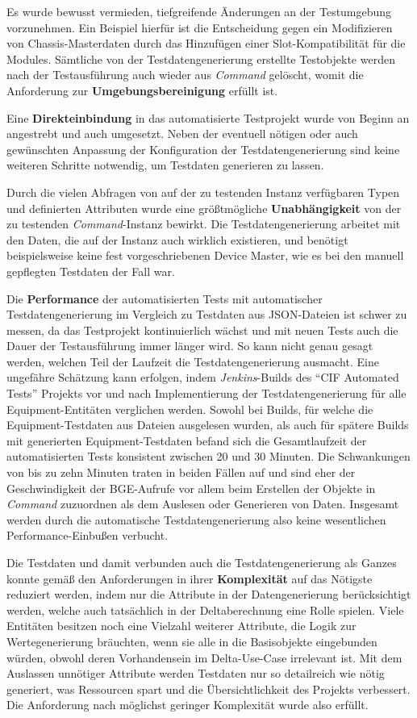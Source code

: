 Es wurde bewusst vermieden, tiefgreifende Änderungen an der Testumgebung vorzunehmen. Ein Beispiel hierfür ist die Entscheidung gegen ein Modifizieren von Chassis-Masterdaten durch das Hinzufügen einer Slot-Kompatibilität für die Modules. Sämtliche von der Testdatengenerierung erstellte Testobjekte werden nach der Testausführung auch wieder aus \textit{Command} gelöscht, womit die Anforderung zur \textbf{Umgebungsbereinigung} erfüllt ist.

Eine \textbf{Direkteinbindung} in das automatisierte Testprojekt wurde von Beginn an angestrebt und auch umgesetzt. Neben der eventuell nötigen oder auch gewünschten Anpassung der Konfiguration der Testdatengenerierung sind keine weiteren Schritte notwendig, um Testdaten generieren zu lassen.

Durch die vielen Abfragen von auf der zu testenden Instanz verfügbaren Typen und definierten Attributen wurde eine größtmögliche \textbf{Unabhängigkeit} von der zu testenden \textit{Command}-Instanz bewirkt. Die Testdatengenerierung arbeitet mit den Daten, die auf der Instanz auch wirklich existieren, und benötigt beispielsweise keine fest vorgeschriebenen Device Master, wie es bei den manuell gepflegten Testdaten der Fall war.

Die \textbf{Performance} der automatisierten Tests mit automatischer Testdatengenerierung im Vergleich zu Testdaten aus \ac{JSON}-Dateien ist schwer zu messen, da das Testprojekt kontinuierlich wächst und mit neuen Tests auch die Dauer der Testausführung immer länger wird. So kann nicht genau gesagt werden, welchen Teil der Laufzeit die Testdatengenerierung ausmacht. Eine ungefähre Schätzung kann erfolgen, indem \textit{Jenkins}-Builds des \enquote{\ac{CIF} Automated Tests} Projekts vor und nach Implementierung der Testdatengenerierung für alle Equipment-Entitäten verglichen werden. Sowohl bei Builds, für welche die Equipment-Testdaten aus Dateien ausgelesen wurden, als auch für spätere Builds mit generierten Equipment-Testdaten befand sich die Gesamtlaufzeit der automatisierten Tests konsistent zwischen 20 und 30 Minuten. Die Schwankungen von bis zu zehn Minuten traten in beiden Fällen auf und sind eher der Geschwindigkeit der \ac{BGE}-Aufrufe vor allem beim Erstellen der Objekte in \textit{Command} zuzuordnen als dem Auslesen oder Generieren von Daten. Insgesamt werden durch die automatische Testdatengenerierung also keine wesentlichen Performance-Einbußen verbucht.

Die Testdaten und damit verbunden auch die Testdatengenerierung als Ganzes konnte gemäß den Anforderungen in ihrer \textbf{Komplexität} auf das Nötigste reduziert werden, indem nur die Attribute in der Datengenerierung berücksichtigt werden, welche auch tatsächlich in der Deltaberechnung eine Rolle spielen. Viele Entitäten besitzen noch eine Vielzahl weiterer Attribute, die Logik zur Wertegenerierung bräuchten, wenn sie alle in die Basisobjekte eingebunden würden, obwohl deren Vorhandensein im Delta-Use-Case irrelevant ist. Mit dem Auslassen unnötiger Attribute werden Testdaten nur so detailreich wie nötig generiert, was Ressourcen spart und die Übersichtlichkeit des Projekts verbessert. Die Anforderung nach möglichst geringer Komplexität wurde also erfüllt.

